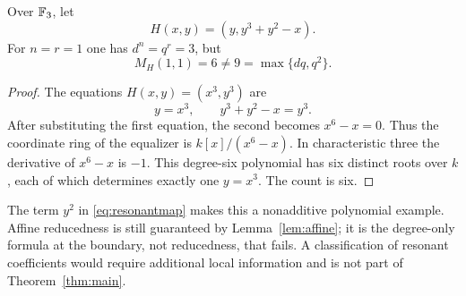 \begin{proposition}\label{prop:resonance}
Over $\mathbb F_3$, let
\begin{equation}\label{eq:resonantmap}
 H(x,y)=(y,y^3+y^2-x).
\end{equation}
For $n=r=1$ one has $d^n=q^r=3$, but
\[
 M_H(1,1)=6\ne9=\max\{d q,q^2\}.
\]
\end{proposition}

\begin{proof}
The equations $H(x,y)=(x^3,y^3)$ are
\[
 y=x^3,\qquad y^3+y^2-x=y^3.
\]
After substituting the first equation, the second becomes $x^6-x=0$.
Thus the coordinate ring of the equalizer is
$k[x]/(x^6-x)$. In characteristic three the derivative of $x^6-x$
is $-1$. This degree-six polynomial has six distinct roots over $k$,
each of which determines exactly one $y=x^3$. The count is six.
\end{proof}

The term $y^2$ in \eqref{eq:resonantmap} makes this a nonadditive
polynomial example. Affine reducedness is still guaranteed by
Lemma~\ref{lem:affine}; it is the degree-only formula at the boundary,
not reducedness, that fails. A classification of resonant coefficients
would require additional local information and is not part of
Theorem~\ref{thm:main}.
